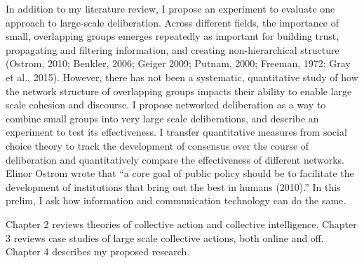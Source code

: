In addition to my literature review, I propose an experiment to evaluate one approach to large-scale deliberation. Across different fields, the importance of small, overlapping groups emerges repeatedly as important for building trust, propagating and filtering information, and creating non-hierarchical structure (Ostrom, 2010; Benkler, 2006; Geiger 2009; Putnam, 2000; Freeman, 1972; Gray et al., 2015). However, there has not been a systematic, quantitative study of how the network structure of overlapping groups impacts their ability to enable large scale cohesion and discourse. I propose networked deliberation as a way to combine small groups into very large scale deliberations, and describe an experiment to test its effectiveness. I transfer quantitative measures from social choice theory to track the development of consensus over the course of deliberation and quantitatively compare the effectiveness of different networks. Elinor Ostrom wrote that
``a core goal of public policy should be to facilitate the development of institutions that bring out the best in humans (2010).'' In this prelim, I ask how information and communication technology can do the same.

Chapter 2 reviews theories of collective action and collective intelligence. Chapter 3 reviews case studies of large scale collective actions, both online and off. Chapter 4 describes my proposed research.
